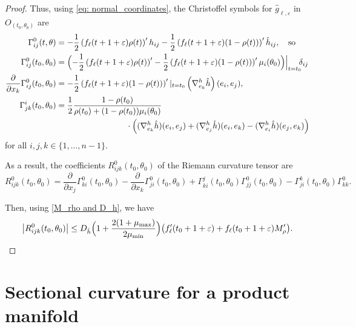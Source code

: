 \documentclass[10pt]{amsart}
\theoremstyle{definition}
\let\eps\varepsilon
\renewcommand{\>}{{\rangle}}
\newcommand{\<}{{\langle}}
\begin{document}
\begin{proof}
Thus, using \eqref{eq: normal_coordinates}, the Christoffel symbols for $\hat g_{\ell,\eps}$ in $O_{(t_0,\theta_0)}$ are\vspace*{-3pt}
\begin{align*}
\Gamma^0_{ij}(t,\theta) &=-\frac{1}{2}\left(f_\ell(t+1+\eps)\rho(t)\right)'h_{ij}-\frac{1}{2}\left(f_\ell(t+1+\eps)(1-\rho(t))\right)'\hat h_{ij}, \quad\text{so}\\
\Gamma^0_{ij}(t_0,\theta_0) &= \Bigl(-\frac{1}{2}\left(f_\ell(t+1+\eps)\rho(t)\right)'-\frac{1}{2}\left(f_\ell(t+1+\eps)(1-\rho(t))\right)'\mu_i(\theta_0)\Bigr)\Big|_{t=t_0}\!\!\delta_{ij}
\\
\frac{\partial}{\partial x_k}\Gamma^0_{ij}(t_0,\theta_0) &= -\frac{1}{2}\left(f_\ell(t+1+\eps)(1-\rho(t))\right)'|_{t=t_0}\left(\nabla^h_{e_k} \hat h\right)(e_i,e_j),
\\
\Gamma^i_{jk}(t_0,\theta_0)&=\frac{1}{2}\frac{1-\rho(t_0)}{\rho(t_0)+(1-\rho(t_0))\mu_i(\theta_0)}\\
&\hspace*{3cm}{}\cdot\left((\nabla^h_{e_k}\hat h)(e_i,e_j)+(\nabla^h_{e_j}\hat h)(e_i,e_k)-(\nabla^h_{e_i}\hat h)(e_j,e_k)\right)
\end{align*}
for all $i,j,k\in\{1,\ldots, n-1\}$.

As a result, the coefficients $R^0_{ijk}(t_0,\theta_0)$ of the Riemann curvature tensor are\vspace*{-3pt}
\begin{equation*}
R^0_{ijk}(t_0,\theta_0) =\frac{\partial}{\partial x_j}\Gamma^0_{ki}(t_0,\theta_0)-\frac{\partial}{\partial x_k}\Gamma^0_{ji}(t_0,\theta_0)+\Gamma^j_{ki}(t_0,\theta_0)\Gamma^0_{jj}(t_0,\theta_0)-\Gamma^k_{ji}(t_0,\theta_0)\Gamma^0_{kk}.
\end{equation*}

Then, using \eqref{M_rho and D_h}, we have\vspace*{-3pt}
\[
\left|R^0_{ijk}(t_0,\theta_0)\right|\leq D_{\hat h}\Bigl(1+\frac{2(1+\mu_{\max})}{2\mu_{\min}}\Bigr)\bigl(f'_\ell(t_0+1+\eps)+f_\ell(t_0+1+\eps)M'_\rho\bigr).\qedhere
\]
\end{proof}

\section{Sectional curvature for a product manifold}
\end{document}
